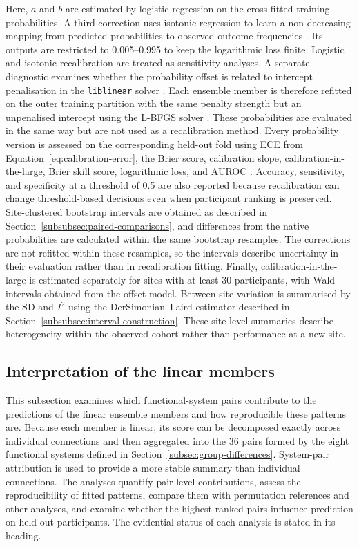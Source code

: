 Here, $a$ and $b$ are estimated by logistic regression on the cross-fitted training probabilities. A third correction uses isotonic regression to learn a non-decreasing mapping from predicted probabilities to observed outcome frequencies \citep{ZadroznyElkan2002}. Its outputs are restricted to 0.005--0.995 to keep the logarithmic loss finite. Logistic and isotonic recalibration are treated as sensitivity analyses. A separate diagnostic examines whether the probability offset is related to intercept penalisation in the \texttt{liblinear} solver \citep{Fanetal2008}. Each ensemble member is therefore refitted on the outer training partition with the same penalty strength but an unpenalised intercept using the L-BFGS solver \citep{Pedregosaetal2011}. These probabilities are evaluated in the same way but are not used as a recalibration method. Every probability version is assessed on the corresponding held-out fold using ECE from Equation~\eqref{eq:calibration-error}, the Brier score, calibration slope, calibration-in-the-large, Brier skill score, logarithmic loss, and AUROC \citep{VanCalsteretal2019,Steyerbergetal2010}. Accuracy, sensitivity, and specificity at a threshold of 0.5 are also reported because recalibration can change threshold-based decisions even when participant ranking is preserved. Site-clustered bootstrap intervals are obtained as described in Section~\ref{subsubsec:paired-comparisons}, and differences from the native probabilities are calculated within the same bootstrap resamples. The corrections are not refitted within these resamples, so the intervals describe uncertainty in their evaluation rather than in recalibration fitting. Finally, calibration-in-the-large is estimated separately for sites with at least 30 participants, with Wald intervals obtained from the offset model. Between-site variation is summarised by the SD and $I^2$ using the DerSimonian--Laird estimator described in Section~\ref{subsubsec:interval-construction}. These site-level summaries describe heterogeneity within the observed cohort rather than performance at a new site.

\subsection{Interpretation of the linear members}
\label{subsec:interpretation}

This subsection examines which functional-system pairs contribute to the predictions of the linear ensemble members and how reproducible these patterns are. Because each member is linear, its score can be decomposed exactly across individual connections and then aggregated into the 36 pairs formed by the eight functional systems defined in Section~\ref{subsec:group-differences}. System-pair attribution is used to provide a more stable summary than individual connections. The analyses quantify pair-level contributions, assess the reproducibility of fitted patterns, compare them with permutation references and other analyses, and examine whether the highest-ranked pairs influence prediction on held-out participants. The evidential status of each analysis is stated in its heading.

